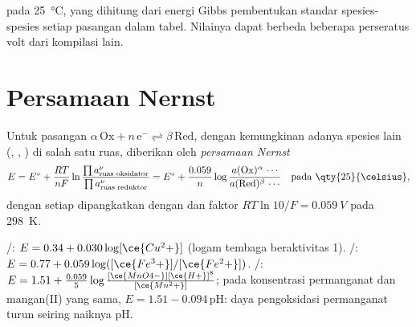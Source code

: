 \begin{omfigure}
\smallskip
{\small {} pada \qty{25}{\celsius}, yang dihitung dari
energi Gibbs pembentukan standar spesies-spesies setiap pasangan dalam
tabel. Nilainya dapat berbeda beberapa perseratus volt dari kompilasi
lain.}
\end{omfigure}

\section{Persamaan Nernst}

\begin{theorem}\label{thm:b1:nernst:nernst}
Untuk pasangan $\alpha\,\mathrm{Ox} + n\,\mathrm{e^-} \rightleftharpoons
\beta\,\mathrm{Red}$, dengan kemungkinan adanya spesies lain (,
, ) di salah satu ruas,  diberikan
oleh \emph{persamaan Nernst}
\[
  E = E^\circ + \frac{RT}{nF}\ln\frac{\prod a_{\text{ruas oksidator}}^{\nu}}{\prod
  a_{\text{ruas reduktor}}^{\nu}}
  = E^\circ + \frac{0.059}{n}\log\frac{a(\mathrm{Ox})^\alpha\,\cdots}{a(\mathrm{Red})^\beta\,\cdots}
  \quad\text{pada \qty{25}{\celsius}},
\]
dengan setiap  dipangkatkan dengan  dan
faktor $RT\ln 10/F = \qty{0.059}{V}$ pada \qty{298}{K}.
\end{theorem}


\begin{example}\label{ex:b1:nernst:examples}
/: $E = 0.34 + 0.030\log[\ce{Cu^2+}]$ (logam tembaga
beraktivitas 1).
/: $E = 0.77 + 0.059\log([\ce{Fe^3+}]/[\ce{Fe^2+}])$.
/: $E = 1.51 + \frac{0.059}{5}\log
\frac{[\ce{MnO4-}][\ce{H+}]^8}{[\ce{Mn^2+}]}$; pada konsentrasi
permanganat dan mangan(II) yang sama, $E = 1.51 - 0.094\,\mathrm{pH}$:
daya pengoksidasi permanganat turun seiring naiknya pH.
\end{example}

